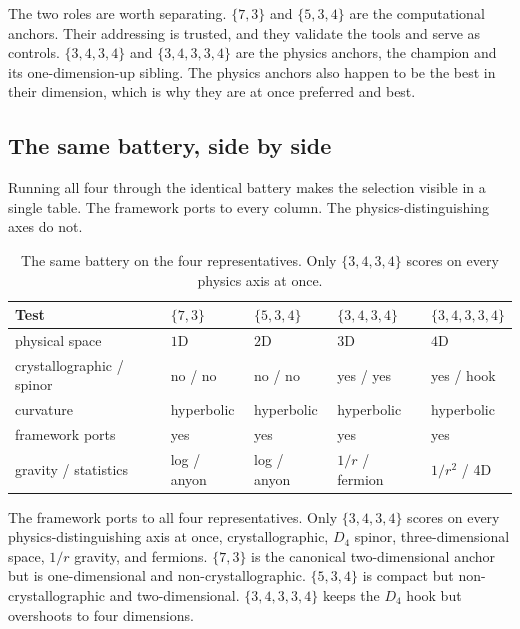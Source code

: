 The two roles are worth separating. $\{7,3\}$ and $\{5,3,4\}$ are the computational anchors. Their addressing is
trusted, and they validate the tools and serve as controls. $\{3,4,3,4\}$ and $\{3,4,3,3,4\}$ are the physics
anchors, the champion and its one-dimension-up sibling. The physics anchors also happen to be the best in their
dimension, which is why they are at once preferred and best.

\subsection{The same battery, side by side}

Running all four through the identical battery makes the selection visible in a single table. The framework ports
to every column. The physics-distinguishing axes do not.

\begin{table}[ht]
\centering
\begin{tabular}{p{3.3cm}p{2.0cm}p{2.0cm}p{2.4cm}p{2.2cm}}
\toprule
Test & $\{7,3\}$ & $\{5,3,4\}$ & $\{3,4,3,4\}$ & $\{3,4,3,3,4\}$ \\
\midrule
physical space & $1$D & $2$D & $3$D & $4$D \\
crystallographic / spinor & no / no & no / no & yes / yes & yes / hook \\
curvature & hyperbolic & hyperbolic & hyperbolic & hyperbolic \\
framework ports & yes & yes & yes & yes \\
gravity / statistics & log / anyon & log / anyon & $1/r$ / fermion & $1/r^2$ / 4D \\
\bottomrule
\end{tabular}
\caption{The same battery on the four representatives. Only $\{3,4,3,4\}$ scores on every physics axis at once.}
\end{table}

\begin{result}
The framework ports to all four representatives. Only $\{3,4,3,4\}$ scores on every physics-distinguishing axis
at once, crystallographic, $D_4$ spinor, three-dimensional space, $1/r$ gravity, and fermions. $\{7,3\}$ is the
canonical two-dimensional anchor but is one-dimensional and non-crystallographic. $\{5,3,4\}$ is compact but
non-crystallographic and two-dimensional. $\{3,4,3,3,4\}$ keeps the $D_4$ hook but overshoots to four
dimensions. \cite{pollard2026vibetest}
\end{result}

